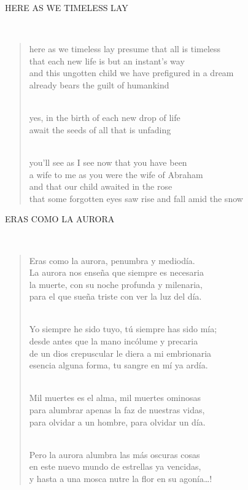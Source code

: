 \documentclass[a4paper, 12pt]{article}
\begin{document}
\pagebreak
\centerline{HERE AS WE TIMELESS LAY}
~ 

\begin{verse}
    
here as we timeless lay presume that all is timeless\\
that each new life is but an instant’s way\\
and this ungotten child we have prefigured in a dream\\
already bears the guilt of humankind\\
~ 

yes, in the birth of each new drop of life\\
await the seeds of all that is unfading\\
~ 

you’ll see as I see now that you have been\\
a wife to me as you were the wife of Abraham\\
and that our child awaited in the rose\\
that some forgotten eyes saw rise and fall amid the snow\\
\end{verse}

\pagebreak
\centerline{ERAS COMO LA AURORA}
~ 

\begin{verse}
    
Eras como la aurora, penumbra y mediodía.\\
La aurora nos enseña que siempre es necesaria\\
la muerte, con su noche profunda y milenaria,\\
para el que sueña triste con ver la luz del día.\\
~ 

Yo siempre he sido tuyo, tú siempre has sido mía;\\
desde antes que la mano incólume y precaria\\
de un dios crepuscular le diera a mi embrionaria\\
esencia alguna forma, tu sangre en mí ya ardía.\\
~ 

Mil muertes es el alma, mil muertes ominosas\\
para alumbrar apenas la faz de nuestras vidas,\\
para olvidar a un hombre, para olvidar un día.\\
~ 

Pero la aurora alumbra las más oscuras cosas\\
en este nuevo mundo de estrellas ya vencidas,\\
y hasta a una mosca nutre la flor en su agonía…!\\
\end{verse}
\end{document}
